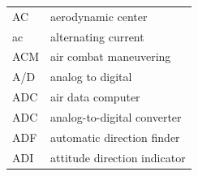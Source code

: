 \documentclass[
]{book}
\begin{document}
\begin{longtable}[]{@{}ll@{}}
\begin{minipage}[t]{0.47\columnwidth}
AC\strut
\end{minipage} & \begin{minipage}[t]{0.47\columnwidth}\raggedright
aerodynamic center\strut
\end{minipage}\tabularnewline
\begin{minipage}[t]{0.47\columnwidth}\raggedright
ac\strut
\end{minipage} & \begin{minipage}[t]{0.47\columnwidth}\raggedright
alternating current\strut
\end{minipage}\tabularnewline
\begin{minipage}[t]{0.47\columnwidth}\raggedright
ACM\strut
\end{minipage} & \begin{minipage}[t]{0.47\columnwidth}\raggedright
air combat maneuvering\strut
\end{minipage}\tabularnewline
\begin{minipage}[t]{0.47\columnwidth}\raggedright
A/D\strut
\end{minipage} & \begin{minipage}[t]{0.47\columnwidth}\raggedright
analog to digital\strut
\end{minipage}\tabularnewline
\begin{minipage}[t]{0.47\columnwidth}\raggedright
ADC\strut
\end{minipage} & \begin{minipage}[t]{0.47\columnwidth}\raggedright
air data computer\strut
\end{minipage}\tabularnewline
\begin{minipage}[t]{0.47\columnwidth}\raggedright
ADC\strut
\end{minipage} & \begin{minipage}[t]{0.47\columnwidth}\raggedright
analog-to-digital converter\strut
\end{minipage}\tabularnewline
\begin{minipage}[t]{0.47\columnwidth}\raggedright
ADF\strut
\end{minipage} & \begin{minipage}[t]{0.47\columnwidth}\raggedright
automatic direction finder\strut
\end{minipage}\tabularnewline
\begin{minipage}[t]{0.47\columnwidth}\raggedright
ADI\strut
\end{minipage} & \begin{minipage}[t]{0.47\columnwidth}\raggedright
attitude direction indicator\strut

\end{minipage}
\end{longtable}
\end{document}
